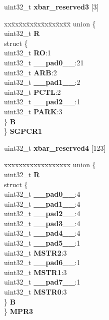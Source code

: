 \begin{DoxyCompactItemize}
\begin{tabbing}
\end{tabbing}\item 
\mbox{\label{structXBAR__tag_a4ae76e04c93d13d9edd22181b4f2146a}} 
uint32\+\_\+t {\bfseries xbar\+\_\+reserved3} \mbox{[}3\mbox{]}
\item 
\mbox{\label{structXBAR__tag_a711f2f59167388d0877a110f067fc09d}} 
\begin{tabbing}
xx\=xx\=xx\=xx\=xx\=xx\=xx\=xx\=xx\=\kill
union \{\\
\>uint32\_t {\bfseries R}\\
\>struct \{\\
\>\>uint32\_t {\bfseries RO}:1\\
\>\>uint32\_t {\bfseries \_\_pad0\_\_}:21\\
\>\>uint32\_t {\bfseries ARB}:2\\
\>\>uint32\_t {\bfseries \_\_pad1\_\_}:2\\
\>\>uint32\_t {\bfseries PCTL}:2\\
\>\>uint32\_t {\bfseries \_\_pad2\_\_}:1\\
\>\>uint32\_t {\bfseries PARK}:3\\
\>\} {\bfseries B}\\
\} {\bfseries SGPCR1}\\

\end{tabbing}\item 
\mbox{\label{structXBAR__tag_a26465abb5091d948ff6a96a03c5cb24b}} 
uint32\+\_\+t {\bfseries xbar\+\_\+reserved4} \mbox{[}123\mbox{]}
\item 
\mbox{\label{structXBAR__tag_a7e814809dff8bf81a106e7ab74c4d300}} 
\begin{tabbing}
xx\=xx\=xx\=xx\=xx\=xx\=xx\=xx\=xx\=\kill
union \{\\
\>uint32\_t {\bfseries R}\\
\>struct \{\\
\>\>uint32\_t {\bfseries \_\_pad0\_\_}:4\\
\>\>uint32\_t {\bfseries \_\_pad1\_\_}:4\\
\>\>uint32\_t {\bfseries \_\_pad2\_\_}:4\\
\>\>uint32\_t {\bfseries \_\_pad3\_\_}:4\\
\>\>uint32\_t {\bfseries \_\_pad4\_\_}:4\\
\>\>uint32\_t {\bfseries \_\_pad5\_\_}:1\\
\>\>uint32\_t {\bfseries MSTR2}:3\\
\>\>uint32\_t {\bfseries \_\_pad6\_\_}:1\\
\>\>uint32\_t {\bfseries MSTR1}:3\\
\>\>uint32\_t {\bfseries \_\_pad7\_\_}:1\\
\>\>uint32\_t {\bfseries MSTR0}:3\\
\>\} {\bfseries B}\\
\} {\bfseries MPR3}\\


\end{tabbing}
\end{DoxyCompactItemize}
